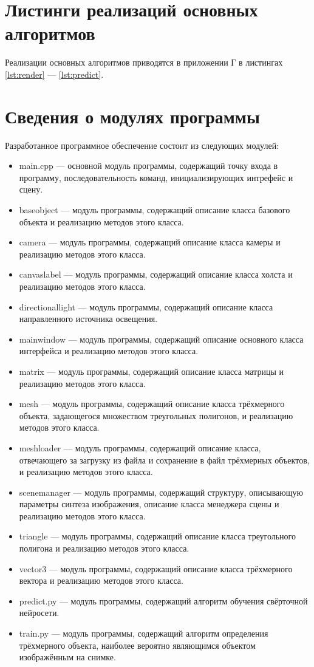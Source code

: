 \section{Листинги реализаций основных алгоритмов}
Реализации основных алгоритмов приводятся в приложении Г в листингах \ref{lst:render} --- \ref{lst:predict}.

\section{Сведения о модулях программы}
Разработанное программное обеспечение состоит из следующих модулей:
\begin{itemize}
\item main.cpp --- основной модуль программы, содержащий точку входа в программу, последовательность команд, инициализирующих интрефейс и сцену.
\item baseobject --- модуль программы, содержащий описание класса базового объекта и реализацию методов этого класса.
\item camera --- модуль программы, содержащий описание класса камеры и реализацию методов этого класса.
\item canvaslabel --- модуль программы, содержащий описание класса холста и реализацию методов этого класса.
\item directionallight --- модуль программы, содержащий описание класса направленного источника освещения.
\item mainwindow --- модуль программы, содержащий описание основного класса интерфейса и реализацию методов этого класса.
\item matrix --- модуль программы, содержащий описание класса матрицы и реализацию методов этого класса.
\item mesh --- модуль программы, содержащий описание класса трёхмерного объекта, задающегося множеством треугольных полигонов, и реализацию методов этого класса.
\item meshloader --- модуль программы, содержащий описание класса, отвечающего за загрузку из файла и сохранение в файл трёхмерных объектов, и реализацию методов этого класса.
\item scenemanager --- модуль программы, содержащий структуру, описывающую параметры синтеза изображения, описание класса менеджера сцены и реализацию методов этого класса.
\item triangle --- модуль программы, содержащий описание класса треугольного полигона и реализацию методов этого класса.
\item vector3 --- модуль программы, содержащий описание класса трёхмерного вектора и реализацию методов этого класса.
\item predict.py --- модуль программы, содержащий алгоритм обучения свёрточной нейросети.
\item train.py --- модуль программы, содержащий алгоритм  определения трёхмерного объекта, наиболее вероятно являющимся объектом изображённым на снимке.
\end{itemize}

